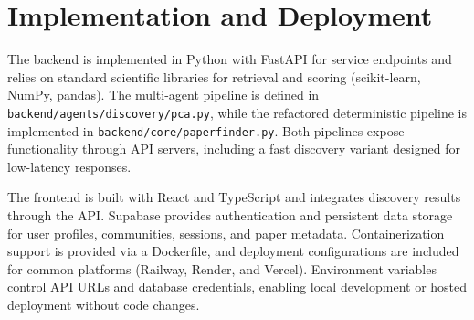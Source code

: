 \section{Implementation and Deployment}
The backend is implemented in Python with FastAPI for service endpoints and relies on standard scientific libraries for retrieval and scoring (scikit-learn, NumPy, pandas). The multi-agent pipeline is defined in \texttt{backend/agents/discovery/pca.py}, while the refactored deterministic pipeline is implemented in \texttt{backend/core/paperfinder.py}. Both pipelines expose functionality through API servers, including a fast discovery variant designed for low-latency responses.

The frontend is built with React and TypeScript and integrates discovery results through the API. Supabase provides authentication and persistent data storage for user profiles, communities, sessions, and paper metadata. Containerization support is provided via a Dockerfile, and deployment configurations are included for common platforms (Railway, Render, and Vercel). Environment variables control API URLs and database credentials, enabling local development or hosted deployment without code changes.
